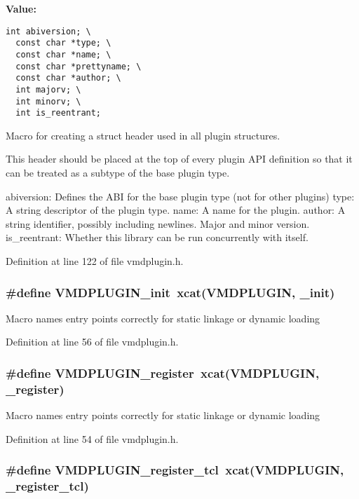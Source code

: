{\bf Value:}

\footnotesize\begin{verbatim}int abiversion; \
  const char *type; \
  const char *name; \
  const char *prettyname; \
  const char *author; \
  int majorv; \
  int minorv; \
  int is_reentrant;\end{verbatim}\normalsize 
Macro for creating a struct header used in all plugin structures.

This header should be placed at the top of every plugin API definition  so that it can be treated as a subtype of the base plugin type.

abiversion: Defines the ABI for the base plugin type (not for other plugins) type: A string descriptor of the plugin type. name: A name for the plugin. author: A string identifier, possibly including newlines. Major and minor version.  is\_\-reentrant: Whether this library can be run concurrently with itself. 

Definition at line 122 of file vmdplugin.h.
\subsubsection{\setlength{\rightskip}{0pt plus 5cm}\#define VMDPLUGIN\_\-init\ xcat(VMDPLUGIN, \_\-init)}\label{vmdplugin_8h_a5}


Macro names entry points correctly for static linkage or dynamic loading 

Definition at line 56 of file vmdplugin.h.
\subsubsection{\setlength{\rightskip}{0pt plus 5cm}\#define VMDPLUGIN\_\-register\ xcat(VMDPLUGIN, \_\-register)}\label{vmdplugin_8h_a3}


Macro names entry points correctly for static linkage or dynamic loading 

Definition at line 54 of file vmdplugin.h.
\subsubsection{\setlength{\rightskip}{0pt plus 5cm}\#define VMDPLUGIN\_\-register\_\-tcl\ xcat(VMDPLUGIN, \_\-register\_\-tcl)}\label{vmdplugin_8h_a4}



